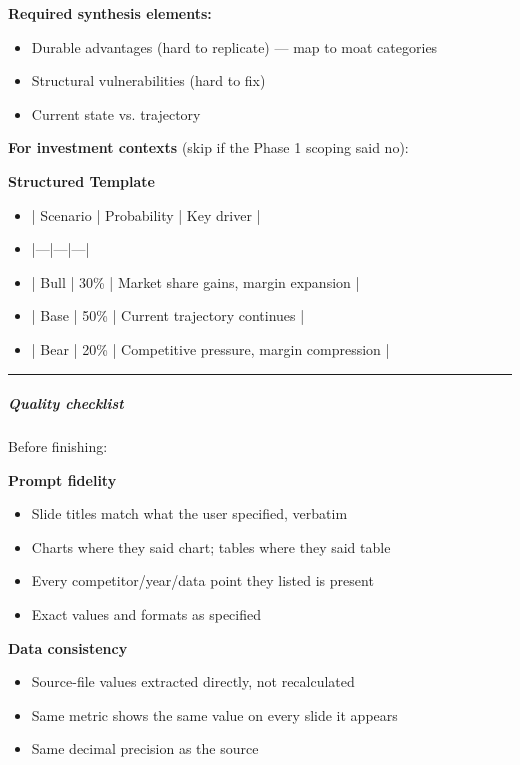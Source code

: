 \documentclass[11pt]{article}
\begin{document}
\textbf{Required synthesis elements:}

\begin{itemize}[leftmargin=*,itemsep=2pt,topsep=2pt]
\item {} Durable advantages (hard to replicate) — map to moat categories
\item {} Structural vulnerabilities (hard to fix)
\item {} Current state vs. trajectory
\end{itemize}

\textbf{For investment contexts} (skip if the Phase 1 scoping said no):


\textbf{Structured Template}
\begin{itemize}[leftmargin=*,itemsep=2pt,topsep=2pt]
\item {} | Scenario | Probability | Key driver |
\item {} |---|---|---|
\item {} | Bull | 30\% | Market share gains, margin expansion |
\item {} | Base | 50\% | Current trajectory continues |
\item {} | Bear | 20\% | Competitive pressure, margin compression |
\end{itemize}

\vspace{0.5em}\hrule\vspace{0.5em}

\subparagraph{Quality checklist}\mbox{}\par

Before finishing:


\textbf{Prompt fidelity}

\begin{itemize}[leftmargin=*,itemsep=2pt,topsep=2pt]
\item {} Slide titles match what the user specified, verbatim
\item {} Charts where they said chart; tables where they said table
\item {} Every competitor/year/data point they listed is present
\item {} Exact values and formats as specified
\end{itemize}

\textbf{Data consistency}

\begin{itemize}[leftmargin=*,itemsep=2pt,topsep=2pt]
\item {} Source-file values extracted directly, not recalculated
\item {} Same metric shows the same value on every slide it appears
\item {} Same decimal precision as the source
\end{itemize}
\end{document}
